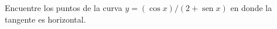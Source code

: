 \item Encuentre los puntos de la curva $y = (\cos x)/(2 + \operatorname{sen} x)$ en donde la tangente es horizontal.
